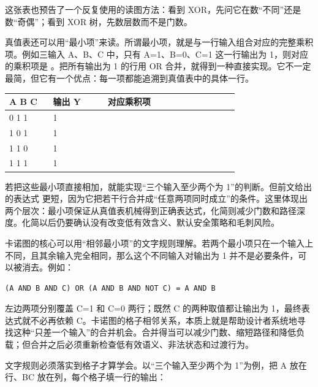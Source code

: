 这张表也预告了一个反复使用的读图方法：看到 XOR，先问它在数“不同”还是数“奇偶”；看到 XOR 树，先数层数而不是门数。

真值表还可以用“最小项”来读。所谓最小项，就是与一行输入组合对应的完整乘积项。例如三输入 A、B、C 中，只有 A=1、B=0、C=1 这一行输出为 1，则对应的乘积项是 。把所有输出为 1 的行用 OR 合并，就得到一种直接实现。它不一定最简，但它有一个优点：每一项都能追溯到真值表中的具体一行。

\begin{longtable}{L{0.16\linewidth}L{0.2\linewidth}L{0.48\linewidth}}
\toprule
A B C & 输出 Y & 对应乘积项 \\
 1 1 & 1 &  \\
1 0 1 & 1 &  \\
1 1 0 & 1 &  \\
1 1 1 & 1 &  \\
\bottomrule
\end{longtable}

若把这些最小项直接相加，就能实现“三个输入至少两个为 1”的判断。但前文给出的表达式  更短，因为它把若干行合并成“任意两项同时成立”的条件。这里体现出两个层次：最小项保证从真值表机械得到正确表达式，化简则减少门数和路径深度。化简以后仍要确认没有改变低有效含义、默认安全策略和毛刺风险。

卡诺图的核心可以用“相邻最小项”的文字规则理解。若两个最小项只在一个输入上不同，且其余输入完全相同，那么这个不同输入对输出为 1 并不是必要条件，可以被消去。例如：

\begin{lstlisting}
(A AND B AND C) OR (A AND B AND NOT C) = A AND B
\end{lstlisting}

左边两项分别覆盖 C=1 和 C=0 两行；既然 C 的两种取值都让输出为 1，最终表达式就不必再依赖 C。卡诺图的格子相邻关系，本质上就是帮助设计者系统地寻找这种“只差一个输入”的合并机会。合并得当可以减少门数、缩短路径和降低负载；但合并之后必须重新检查低有效语义、非法状态和过渡行为。

文字规则必须落实到格子才算学会。以“三个输入至少两个为 1”为例，把 A 放在行、BC 放在列，每个格子填一行的输出：

